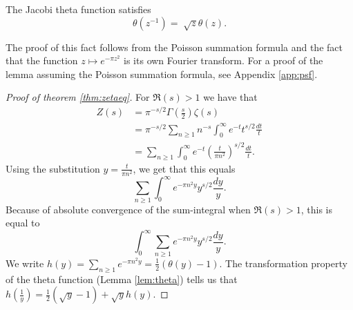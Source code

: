 \documentclass{amsart}
\begin{document}
\begin{lemma}
  \label{lem:theta}
  The Jacobi theta function satisfies
  \[\theta(z^{-1}) = \sqrt[]{z}\theta(z). \]
\end{lemma}
The proof of this fact follows from the Poisson summation formula and the fact that the function $z \mapsto e^{-\pi z^2}$ is its own Fourier transform. For a proof of the lemma assuming the Poisson summation formula, see Appendix \ref{app:psf}.


\begin{proof}[Proof of theorem \ref{thm:zetaeq}]
  For $\Re(s) > 1$ we have that
  \begin{align*}
    Z(s) &= \pi^{-s/2}\Gamma\left(\frac{s}{2}\right)\zeta(s) \\
         &= \pi^{-s/2}\sum_{n\geq 1} n^{-s} \int_0^\infty e^{-t}t^{s/2} \frac{dt}{t} \\
         &= \sum_{n\geq 1} \int_0^\infty e^{-t} \left(\frac{t}{\pi n^2}\right)^{s/2} \frac{dt}{t}.
  \end{align*}
  Using the substitution $y=\frac{t}{\pi n^2}$, we get that this equals
  \[\sum_{n\geq 1} \int_0^\infty e^{-\pi n^2 y} y^{s/2} \frac{dy}{y}. \]
  Because of absolute convergence of the sum-integral when $\Re(s) > 1$, this is equal to
  \[ \int_0^\infty\sum_{n\geq 1} e^{-\pi n^2 y} y^{s/2} \frac{dy}{y}. \]
  We write $h(y) = \sum_{n\geq 1} e^{-\pi n^2 y} = \frac{1}{2}(\theta(y)-1)$. The transformation property of the theta function (Lemma \ref{lem:theta}) tells us that $h\left(\frac{1}{y}\right) = \frac{1}{2}(\sqrt{y} - 1) + \sqrt{y}h(y)$.


\end{proof}
\end{document}
